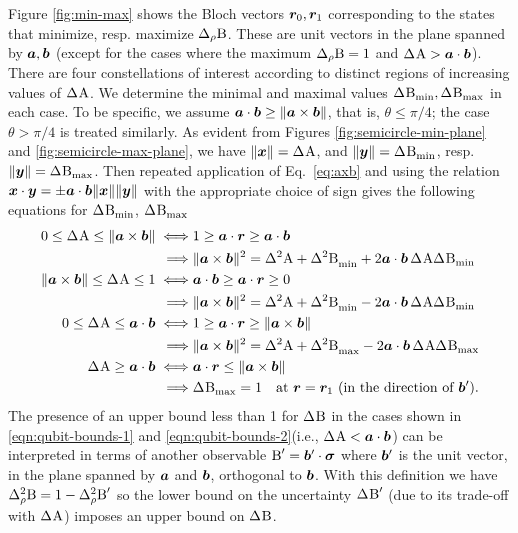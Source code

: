 Figure \ref{fig:min-max}  shows the Bloch vectors $\bm{r}_0,\bm{r}_1$ corresponding to the states that minimize, resp. maximize $\sdevr{\opb}$. These are unit vectors in the plane spanned by $\bm{a},\bm{b}$ (except for the cases where the maximum $\sdevr{\opb}=1$ and $\sdev{\opa} > \boa\cdot\bob$). There are four constellations of interest according to distinct regions of increasing values of $\sdev{\opa}$. We determine the minimal and maximal values $\sdevmin{\opb},\sdevmax{\opb}$ in each case. To be specific, we assume $\bm{a}\cdot\bm{b}\ge\|\bm{a}\times\bm{b}\|$, that is, $\theta\le\pi/4$; the case $\theta>\pi/4$ is treated similarly. As evident from Figures \ref{fig:semicircle-min-plane} and \ref{fig:semicircle-max-plane}, we have $\|\boex\|=\sdev{\opa}$, and $\|\boy\|=\sdevmin{\opb}$, resp. $\|\boy\|=\sdevmax{\opb}$. Then repeated application of Eq.~\ref{eq:axb} and using the relation $\bm{x}\cdot\bm{y}=\pm\bm{a}\cdot\bm{b}\|\bm{x}\|\|\bm{y}\|$ with the appropriate choice of sign gives the following equations for $\sdevmin{\opb}$, $\sdevmax{\opb}$
\begin{align}
  \label{eqn:qubit-bounds-1}
   0\leq\sdev{\opa} \leq\|\boa\times\bob\|\iff &1\geq \boa\cdot\bor\geq\boa\cdot\bob\\
    \implies&\|\boa\times\bob\|^2=\var{\opa}+\varmin{\opb}+2\boa\cdot\bob\,\sdev{\opa}\sdevmin{\opb}\\  
  \label{eqn:qubit-bounds-2}
   \|\boa\times\bob\|\leq\sdev{\opa} \leq 1\iff &\boa\cdot\bob\geq\boa\cdot\bor\geq 0\\
  \implies&\|\boa\times\bob\|^2=\var{\opa}+\varmin{\opb}-2\boa\cdot\bob\,\sdev{\opa}\sdevmin{\opb}\\
  \label{eqn:qubit-bounds-3}
  0\leq\sdev{\opa} \leq\boa\cdot\bob\iff &1\geq\boa\cdot\bor\geq\|\boa\times\bob\|\\
  \implies&\|\boa\times\bob\|^2=\var{\opa}+\varmax{\opb}-2\boa\cdot\bob\,\sdev{\opa}\sdevmax{\opb}\\
  \label{eqn:qubit-bounds-4}
  \sdev{\opa}\geq\boa\cdot\bob\iff&\boa\cdot\bor\leq\|\boa\times\bob\|\\
  \implies&\sdevmax{\opb}=1\quad\text{at }\bor=\bor_1\ (\text{in the direction of }\bob').
\end{align}
The presence of an upper bound less than 1 for $\sdev{\opb}$ in the cases shown in \eqref{eqn:qubit-bounds-1} and \eqref{eqn:qubit-bounds-2}(i.e., $\sdev{\opa}< \boa\cdot\bob$) can be interpreted in terms of another observable $\operatorname{B}^\prime = \bm{b}^\prime\cdot{\boldsymbol\sigma}$ where $\bm{b}^\prime$ is the unit vector, in the plane spanned by $\bm{a}$ and $\bm{b}$, orthogonal to $\bm{b}$. With this definition we have $\varr\opb = 1-\varr{\opb^\prime}$ so the lower bound on the uncertainty  $\sdev{\opb^\prime}$ (due to its trade-off with $\sdev{\opa}$) imposes an upper bound on $\sdev{\opb}$.

